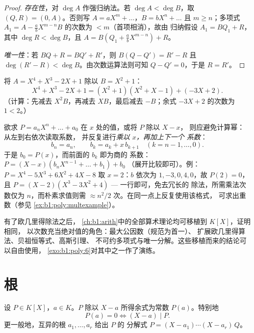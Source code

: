 \begin{proof}
\emph{存在性}，对 $\deg A$ 作强归纳法。若 $\deg A < \deg
B$，取 $(Q, R) = (0, A)$。否则写 $A = a X^m + \dots$，$B =
b X^n + \dots$ 且 $m \geq n$；多项式 $A_1 = A - \frac ab
X^{m-n} B$ 的次数为 $< m$（首项相消），故由
归纳假设 $A_1 = BQ_1 + R$，其中 $\deg R < \deg B$，且 $A = B(Q_1 +
\frac ab X^{m-n}) + R$。

\emph{唯一性}：若 $BQ + R = BQ' + R'$，则 $B(Q - Q') = R' - R$
且 $\deg(R' - R) < \deg B$。由次数运算法则可知 $Q - Q'
= 0$，于是 $R = R'$。
\end{proof}

\begin{example}\label{ex:b1:poly:division}
将 $A = X^4 + X^3 - 2X + 1$ 除以 $B = X^2 + 1$：
\[
X^4 + X^3 - 2X + 1 = (X^2 + 1)(X^2 + X - 1) + (-3X + 2).
\]
（计算：先减去 $X^2 B$，再减去 $X B$，最后减去 $-B$；余式
$-3X + 2$ 的次数为 $1 < 2$。）
\end{example}

\begin{method}[霍纳法]\label{met:b1:poly:horner}
欲求 $P = a_nX^n + \dots + a_0$ 在 $x$ 处的值，或将 $P$ 除以 $X - x$，
则应避免计算幂：从左到右依次读取系数，
并反复进行\emph{乘以 $x$，再加上下一个
系数}：
\[
b_n = a_n, \qquad b_{k} = a_{k} + x\,b_{k+1}
\quad (k = n-1, \dots, 0) .
\]
于是 $b_0 = P(x)$，而前面的 $b_k$ 即为商的
系数：$P = (X - x)(b_nX^{n-1} + \dots + b_1) + b_0$
（展开比较即可）。例：$P = X^4 - 5X^3 + 6X^2 + 4X - 8$
取 $x = 2$：$b$ 依次为 $1, -3, 0, 4, 0$，故 $P(2) = 0$，且 $P
= (X-2)(X^3 - 3X^2 + 4)$ --- 一行即可，免去冗长的
除法，所需乘法次数仅为 $n$，而朴素求值则需 $\approx n^2/2$
次。在同一点上反复使用该格式，
可求出重数（参见
\cref{ex:b1:poly:multexample}）。
\end{method}

\begin{remark}[{$K[X]$ 的算术}]
有了欧几里得除法之后，
\cref{ch:b1:arith}中的全部算术理论均可移植到 $K[X]$，证明相同，
以次数充当绝对值的角色：最大公因数（规范为首一）、
扩展欧几里得算法、贝祖恒等式、高斯引理、
不可约多项式与唯一分解。这些移植而来的结论可以自由使用，
\cref{exo:b1:poly:6}对其中之一作了演练。
\end{remark}

\section{根}

\begin{theorem}[因式定理]\label{thm:b1:poly:factor}
设 $P \in K[X]$，$a \in K$。$P$ 除以
$X - a$ 所得余式为常数 $P(a)$。特别地
\[
P(a) = 0 \iff (X - a) \mid P .
\]
更一般地，互异的根 $a_1, \dots, a_r$ 给出 $P$ 的
分解式 $P = (X - a_1)\cdots(X - a_r)\, Q$。
\end{theorem}

